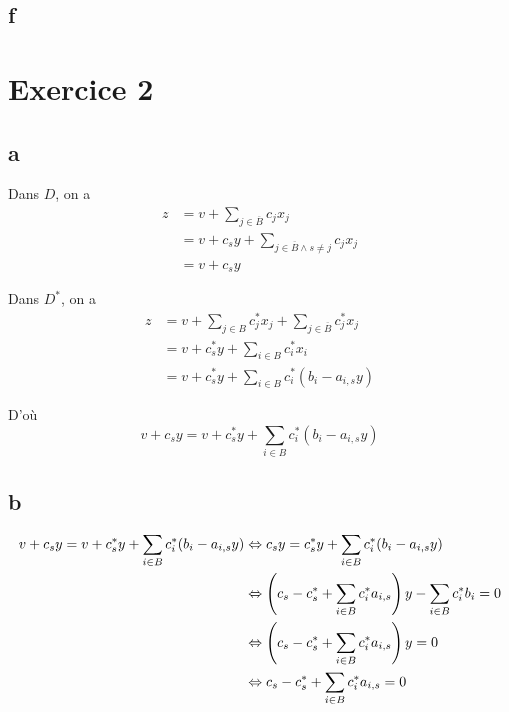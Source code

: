 \subsection*{f}



\section*{Exercice 2}

\subsection*{a}

Dans $D$, on a 
\[
    \begin{aligned}
        z &= v + \sum\limits_{j\in\overline{B}} c_j x_j \\
        &= v + c_s y + \sum\limits_{j\in\overline{B} \wedge s\neq j} c_j x_j\\
        &= v + c_s y
    \end{aligned}
\]

Dans $D^*$, on a 
\[
    \begin{aligned}
        z &= v + \sum\limits_{j\in B} c_j^*x_j + \sum\limits_{j\in \overline{B}} c_j^*x_j \\
        &= v + c^*_s y + \sum\limits_{i\in B} c_i^* x_i \\
        &= v + c^*_s y + \sum\limits_{i\in B} c_i^* (b_i - a_{i,s}y)
    \end{aligned}
\]

D'où
\[
    v + c_s y = v + c^*_s y + \sum\limits_{i\in B} c_i^* (b_i - a_{i,s}y)
\]

\subsection*{b}

\[
    \begin{aligned}
        v + c_s y = v + c^*_s y + \sum\limits_{i\in B} c_i^* (b_i - a_{i,s}y) &\Leftrightarrow c_s y = c^*_s y + \sum\limits_{i\in B} c_i^* (b_i - a_{i,s}y)\\
        &\Leftrightarrow \left(c_s - c^*_s + \sum\limits_{i\in B} c_i^*  a_{i,s}\right) y - \sum\limits_{i\in B} c_i^* b_i = 0\\
        &\Leftrightarrow \left(c_s - c^*_s + \sum\limits_{i\in B} c_i^*  a_{i,s}\right) y =0\\
        &\Leftrightarrow c_s - c^*_s + \sum\limits_{i\in B} c_i^*  a_{i,s} =0
    \end{aligned}
\]

